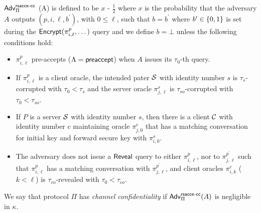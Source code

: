 \begin{definition} \label{def:rsacce-cc}
 $\mathsf{Adv}^{\mathsf{rsacce\textsc{-} cc}}_{\Pi}$ (A) is defined to be
 $x$ - $\frac{1}{2}$ where $x$ is the probability that
 the adversary $A$ outputs $(p, i, \ell, b^{\prime})$,
 with $0\leq \ell$, such that $b = b^{\prime}$ where
 $b^{\prime} \in \{0,1\}$ is set during the
 $\mathsf{Encrypt}(\pi^p_{i,\ell},\dots)$ query and we define
 $b=\bot$ unless the following conditions hold:
 \begin{itemize}
  \item{$\pi^p_{i,\ell}$ pre-accepts
  ($\Lambda = \mathsf{preaccept}$) when $A$
  issues its $\tau_0$-th query.}

  \item{If $\pi^p_{i,\ell}$ is a client oracle, the
  intended pater $\mathcal{S}$ with identity number $s$ is $\tau_s$-corrupted
  with $\tau_0 < \tau_s$ and the server oracle $\pi^s_{j,\ell}$ is
  $\tau_{so}$-corrupted with $\tau_0 < \tau_{so}$.}

  \item{If $P$ is a server $\mathcal{S}$ with identity number $s$, then there
  is a client $\mathcal{C}$ with identity number $c$ maintaining oracle
  $\pi^c_{j,0}$ that has a matching conversation for initial key and
  forward secure key with $\pi^s_{i,0}$.}

  \item{The adversary does not issue a $\mathsf{Reveal}$ query
  to either $\pi^p_{i,\ell}$, nor to
  $\pi^{p^{\prime}}_{j,\ell}$ such that $\pi^p_{i,\ell}$
  has a matching conversation with
  $\pi^{p^{\prime}}_{j,\ell}$, and client oracles $\pi^c_{i,k}$
  ($k < \ell$) is $\tau_{co}$-revealed with $\tau_0 < \tau_{co}$.}
 \end{itemize}
 We say that protocol $\Pi$ has
 \textit{channel confidentiality} if
 $\mathsf{Adv}^{\mathsf{rsacce\textsc{-} cc}}_{\Pi}(A)$ is negligible in $\kappa$.
\end{definition}

